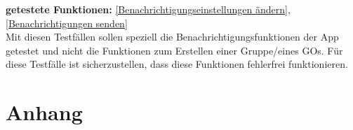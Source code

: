 \documentclass[parskip=full]{scrartcl}
\begin{document}
\textbf{getestete Funktionen: }\ref{Benachrichtigungseinstellungen ändern}, \ref{Benachrichtigungen senden} \\
Mit diesen Testfällen sollen speziell die Benachrichtigungsfunktionen der App getestet und nicht die Funktionen zum Erstellen einer Gruppe/eines GOs. Für diese Testfälle ist sicherzustellen, dass diese Funktionen fehlerfrei funktionieren.

\newpage
\section{Anhang}

\newpage
\printglossary	
\end{document}
